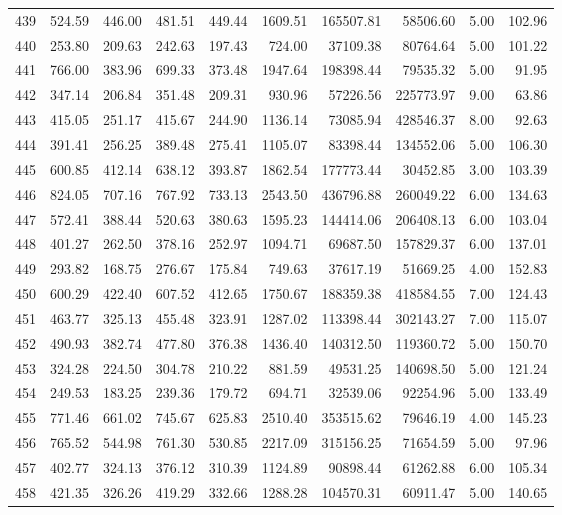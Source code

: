 \begin{tabular}{lrrrrrrrrr}
439 & 524.59 & 446.00 & 481.51 & 449.44 & 1609.51 & 165507.81 & 58506.60 & 5.00 & 102.96 \\
440 & 253.80 & 209.63 & 242.63 & 197.43 & 724.00 & 37109.38 & 80764.64 & 5.00 & 101.22 \\
441 & 766.00 & 383.96 & 699.33 & 373.48 & 1947.64 & 198398.44 & 79535.32 & 5.00 & 91.95 \\
442 & 347.14 & 206.84 & 351.48 & 209.31 & 930.96 & 57226.56 & 225773.97 & 9.00 & 63.86 \\
443 & 415.05 & 251.17 & 415.67 & 244.90 & 1136.14 & 73085.94 & 428546.37 & 8.00 & 92.63 \\
444 & 391.41 & 256.25 & 389.48 & 275.41 & 1105.07 & 83398.44 & 134552.06 & 5.00 & 106.30 \\
445 & 600.85 & 412.14 & 638.12 & 393.87 & 1862.54 & 177773.44 & 30452.85 & 3.00 & 103.39 \\
446 & 824.05 & 707.16 & 767.92 & 733.13 & 2543.50 & 436796.88 & 260049.22 & 6.00 & 134.63 \\
447 & 572.41 & 388.44 & 520.63 & 380.63 & 1595.23 & 144414.06 & 206408.13 & 6.00 & 103.04 \\
448 & 401.27 & 262.50 & 378.16 & 252.97 & 1094.71 & 69687.50 & 157829.37 & 6.00 & 137.01 \\
449 & 293.82 & 168.75 & 276.67 & 175.84 & 749.63 & 37617.19 & 51669.25 & 4.00 & 152.83 \\
450 & 600.29 & 422.40 & 607.52 & 412.65 & 1750.67 & 188359.38 & 418584.55 & 7.00 & 124.43 \\
451 & 463.77 & 325.13 & 455.48 & 323.91 & 1287.02 & 113398.44 & 302143.27 & 7.00 & 115.07 \\
452 & 490.93 & 382.74 & 477.80 & 376.38 & 1436.40 & 140312.50 & 119360.72 & 5.00 & 150.70 \\
453 & 324.28 & 224.50 & 304.78 & 210.22 & 881.59 & 49531.25 & 140698.50 & 5.00 & 121.24 \\
454 & 249.53 & 183.25 & 239.36 & 179.72 & 694.71 & 32539.06 & 92254.96 & 5.00 & 133.49 \\
455 & 771.46 & 661.02 & 745.67 & 625.83 & 2510.40 & 353515.62 & 79646.19 & 4.00 & 145.23 \\
456 & 765.52 & 544.98 & 761.30 & 530.85 & 2217.09 & 315156.25 & 71654.59 & 5.00 & 97.96 \\
457 & 402.77 & 324.13 & 376.12 & 310.39 & 1124.89 & 90898.44 & 61262.88 & 6.00 & 105.34 \\
458 & 421.35 & 326.26 & 419.29 & 332.66 & 1288.28 & 104570.31 & 60911.47 & 5.00 & 140.65 \\

\end{tabular}
